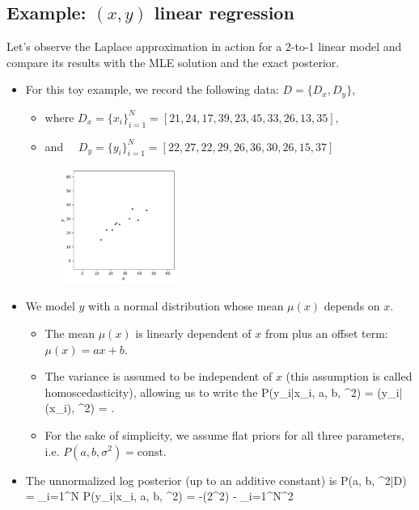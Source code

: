 \subsection{Example: $(x,y)$ linear regression}
Let's observe the Laplace approximation in action for a 2-to-1 linear model and compare its results with the MLE solution and the exact posterior.
\begin{itemize}
	\item For this toy example, we record the following data: $D = \{D_x, D_y\}$, 
	\begin{itemize}
		\item where $D_x = \{x_i\}_{i=1}^N = [21, 24, 17, 39, 23, 45, 33, 26, 13, 35]$, 
		\item and $\quad D_y = \{y_i\}_{i=1}^N = [22, 27, 22, 29, 26, 36, 30, 26, 15, 37]$
	\end{itemize}
	\begin{figure}[h]
	\centering
		\includegraphics[width=0.37\textwidth]{./figs/06-data.pdf}
\end{figure}
	\item We model $y$ with a normal distribution whose mean $\mu(x)$ depends on $x$.
	\begin{itemize}
		\item The mean $\mu(x)$ is linearly dependent of $x$ from plus an offset term: $\mu(x) = a x + b$.
		\item The variance is assumed to be independent of $x$ (this assumption is called homoscedasticity), allowing us to write the 
		\be
			P(y_i\;|\;x_i, a, b, \sigma^2) = (y_i\;|\;\mu(x_i), \sigma^2) =  \exp{}.
		\ee
		\item For the sake of simplicity, we assume flat priors for all three parameters, i.e. $P(a, b, \sigma^2) = \text{const.}$
	\end{itemize}
	\item The unnormalized log posterior (up to an additive constant) is
		\be
			\log P\s(a, b, \sigma^2\;|\;D) = \sum_{i=1}^N \log P(y_i\;|\;x_i, a, b, \sigma^2)  = -\log(2\pi \sigma^2) - \sum_{i=1}^N\Big[y_i - (ax_i + b)\Big]^2

\end{itemize}
